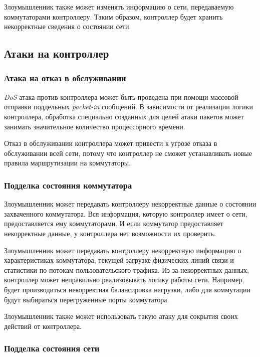 \documentclass[../thesis.tex]{subfiles}
\begin{document}
Злоумышленник также может изменять информацию о сети, передаваемую коммутаторами контроллеру.
Таким образом, контроллер будет хранить некорректные сведения о состоянии сети.

\subsection{Атаки на контроллер}

\subsubsection{Атака на отказ в обслуживании}

\textit{DoS} атака против контроллера может быть проведена при помощи массовой отправки поддельных \textit{packet-in} сообщений.
В зависимости от реализации логики контроллера, обработка специально созданных для целей атаки пакетов может занимать значительное количество процессорного времени.

Отказ в обслуживании контроллера может привести к угрозе отказа в обслуживании всей сети, потому что контроллер не сможет устанавливать новые правила маршрутизации на коммутаторы.

\subsubsection{Подделка состояния коммутатора}

Злоумышленник может передавать контроллеру некорректные данные о состоянии захваченного коммутатора.
Вся информация, которую контроллер имеет о сети, предоставляется ему коммутаторами.
И если коммутатор предоставляет некорректные данные, у контроллера нет возможности их проверить.

Злоумышленник может передавать контроллеру некорректную информацию о характеристиках коммутатора, текущей загрузке физических линий связи и статистики по потокам пользовательского трафика.
Из-за некорректных данных, контроллер может неправильно реализовывать логику работы сети.
Например, будет производиться некорректная балансировка нагрузки, либо для коммутации будут выбираться перегруженные порты коммутатора.

Злоумышленник также может использовать такую атаку для сокрытия своих действий от контроллера.

\subsubsection{Подделка состояния сети}
\end{document}
